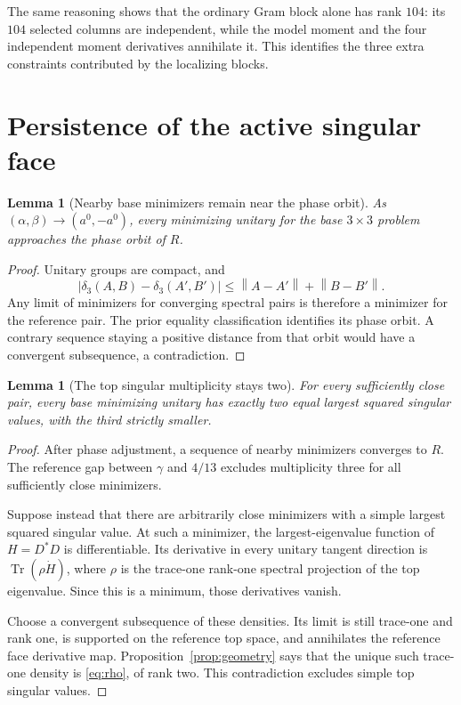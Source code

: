 \documentclass[11pt]{article}
\newtheorem{lemma}[theorem]{Lemma}
\theoremstyle{remark}\newtheorem{remark}[theorem]{Remark}
\newcommand{\Tr}{\operatorname{Tr}}
\newcommand{\norm}[1]{\left\lVert#1\right\rVert}
\begin{document}
The same reasoning shows that the ordinary Gram block alone has rank $104$: its $104$ selected columns are independent, while the model moment and the four independent moment derivatives annihilate it. This identifies the three extra constraints contributed by the localizing blocks.

\section{Persistence of the active singular face}
\begin{lemma}[Nearby base minimizers remain near the phase orbit]\label{lem:compact}
As $(\alpha,\beta)\to(a^0,-a^0)$, every minimizing unitary for the base $3\times3$ problem approaches the phase orbit of $R$.
\end{lemma}
\begin{proof}
Unitary groups are compact, and
\[
 |\delta_3(A,B)-\delta_3(A',B')|\le\norm{A-A'}+\norm{B-B'}.
\]
Any limit of minimizers for converging spectral pairs is therefore a minimizer for the reference pair. The prior equality classification identifies its phase orbit. A contrary sequence staying a positive distance from that orbit would have a convergent subsequence, a contradiction.
\end{proof}

\begin{lemma}[The top singular multiplicity stays two]\label{lem:multiplicity}
For every sufficiently close pair, every base minimizing unitary has exactly two equal largest squared singular values, with the third strictly smaller.
\end{lemma}
\begin{proof}
After phase adjustment, a sequence of nearby minimizers converges to $R$. The reference gap between $\gamma$ and $4/13$ excludes multiplicity three for all sufficiently close minimizers.

Suppose instead that there are arbitrarily close minimizers with a simple largest squared singular value. At such a minimizer, the largest-eigenvalue function of $H=D^*D$ is differentiable. Its derivative in every unitary tangent direction is $\Tr(\rho\dot H)$, where $\rho$ is the trace-one rank-one spectral projection of the top eigenvalue. Since this is a minimum, those derivatives vanish.

Choose a convergent subsequence of these densities. Its limit is still trace-one and rank one, is supported on the reference top space, and annihilates the reference face derivative map. Proposition~\ref{prop:geometry} says that the unique such trace-one density is \eqref{eq:rho}, of rank two. This contradiction excludes simple top singular values.
\end{proof}
\end{document}

